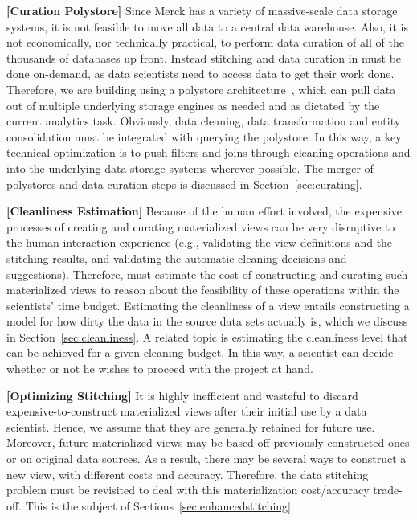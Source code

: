 {\bf[Curation Polystore]} Since Merck has a variety of massive-scale data storage systems, it is  not feasible to move all data to a  central data warehouse. Also, it is not economically, nor technically practical, to perform data curation of all of the thousands of databases up front.
 Instead stitching and data curation in \dcv must be done on-demand, as data scientists need to access data to get
their work done.  Therefore, we are building \dcv using a polystore architecture~\cite{DBLP:journals/sigmod/DugganESBHKMMMZ15}, which  can pull data out of multiple underlying storage engines as needed and as dictated by the current analytics task.  Obviously, data cleaning, data transformation and entity consolidation must be integrated with querying the polystore.  In this way, a key technical optimization is to push filters and joins through cleaning operations and into the underlying data storage systems wherever possible.  The
merger of polystores and data curation steps is discussed in Section~\ref{sec:curating}.

{\bf[Cleanliness Estimation]}  Because of the human effort involved, the expensive processes of creating and curating materialized views  can be very disruptive to the human interaction experience (e.g., validating the view definitions and the stitching results, and validating the automatic cleaning decisions and suggestions).  Therefore, \dcv must estimate the cost of constructing and curating such materialized views  to reason about the feasibility of these operations within the scientists' time budget.  Estimating the cleanliness of a view  entails constructing a model for how dirty the data in the source data sets actually is, which we discuss in Section~\ref{sec:cleanliness}. A related topic is estimating the cleanliness level that can be achieved for a given cleaning budget.  In this way, a scientist can decide
whether or not he wishes to proceed with the project at hand.

{\bf [Optimizing Stitching]} It is highly inefficient and wasteful to  discard expensive-to-construct materialized views after their initial use by a data scientist.  Hence, we assume that they are generally retained for future use.  Moreover, future materialized views  may be based off previously constructed ones or on original data sources.  As a result, there may be several ways to construct a new view, with different  costs and accuracy. Therefore, the data stitching problem must be revisited to deal with this materialization cost/accuracy trade-off.  This is the subject of Sections~\ref{sec:enhancedstitching}.

